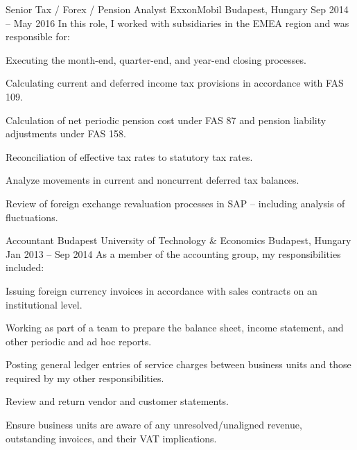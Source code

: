 \begin{cventries}

  \cventry
    {Senior Tax / Forex / Pension Analyst} %
    {ExxonMobil} %
    {Budapest, Hungary} %
    {Sep 2014 -- May 2016} %
    {In this role, I worked with subsidiaries in the EMEA region and was responsible for:} %
    {
      \begin{cvitems} %
        \item {Executing the month-end, quarter-end, and year-end closing processes.}
        \item {Calculating current and deferred income tax provisions in accordance with FAS 109.}
        \item {Calculation of net periodic pension cost under FAS 87 and pension liability adjustments under FAS 158.}
        \item {Reconciliation of effective tax rates to statutory tax rates.}
        \item {Analyze movements in current and noncurrent deferred tax balances.}
        \item {Review of foreign exchange revaluation processes in SAP -- including analysis of fluctuations.}
      \end{cvitems}
    }


  \cventry
    {Accountant} %
    {Budapest University of Technology \& Economics} %
    {Budapest, Hungary} %
    {Jan 2013 -- Sep 2014} %
    {As a member of the accounting group, my responsibilities included:} %
    {
      \begin{cvitems} %
        \item {Issuing foreign currency invoices in accordance with sales contracts on an institutional level.}
        \item {Working as part of a team to prepare the balance sheet, income statement, and other periodic and ad hoc reports.}
        \item {Posting general ledger entries of service charges between business units and those required by my other responsibilities.}
        \item {Review and return vendor and customer statements.}
        \item {Ensure business units are aware of any unresolved/unaligned revenue, outstanding invoices, and their VAT implications.}
      \end{cvitems}
    }


\end{cventries}
